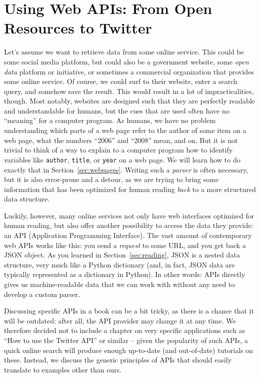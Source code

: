 %

\section{Using Web APIs: From Open Resources to Twitter}
\label{sec:apis}

Let's assume we want to retrieve data from some online service. This
could be some social media platform, but could also be a government website,
some \emph{open data} platform or initiative, or sometimes a
commercial organization that provides some online service.  Of course,
we could surf to their website, enter a search query, and somehow save
the result. This would result in a lot of impracticalities,
though. Most notably, websites are designed such that they are
perfectly readable and understandable for humans, but the cues that
are used often have no ``meaning'' for a computer program. As humans,
we have no problem understanding which parts of a web page refer to
the author of some item on a web page, what the numbers ``2006'' and
``2008'' mean, and on. But it is not trivial to think of a way to
explain to a computer program how to identify variables like
\texttt{author}, \texttt{title}, or \texttt{year} on a web page.
We will learn how to do exactly that in Section~\ref{sec:webpages}. Writing
such a \emph{parser} is often necessary, but it is also error-prone
and  a detour, as we are trying to bring some information
that has been optimized for human reading \emph{back} to a more
structured data structure.

Luckily, however, many online services  not only have web interfaces
optimized for human reading, but also offer another possibility to
access the data they provide: an API (Application Programming
Interface).
The vast amount of contemporary web APIs works like this: you send a
\emph{request} to some URL, and you get back a  JSON object. As you
learned in Section~\ref{sec:reading}, JSON is a nested data structure, very
much like a Python dictionary (and, in fact, JSON data are typically 
represented as a dictionary in Python). In other words: APIs directly
gives us machine-readable data that we can work with without any need
to develop a custom parser.

Discussing specific APIs in a book can be a bit tricky, as there is a
chance that it will be outdated: after all, the API provider may change
it at any time. We therefore decided not to include a chapter on very
specific applications such as ``How to use the Twitter API'' or similar --
given the popularity of such APIs, a quick online search will produce
enough up-to-date (and out-of-date) tutorials on these. Instead,
we discuss the generic principles of APIs that should easily translate
to  examples other than ours.


